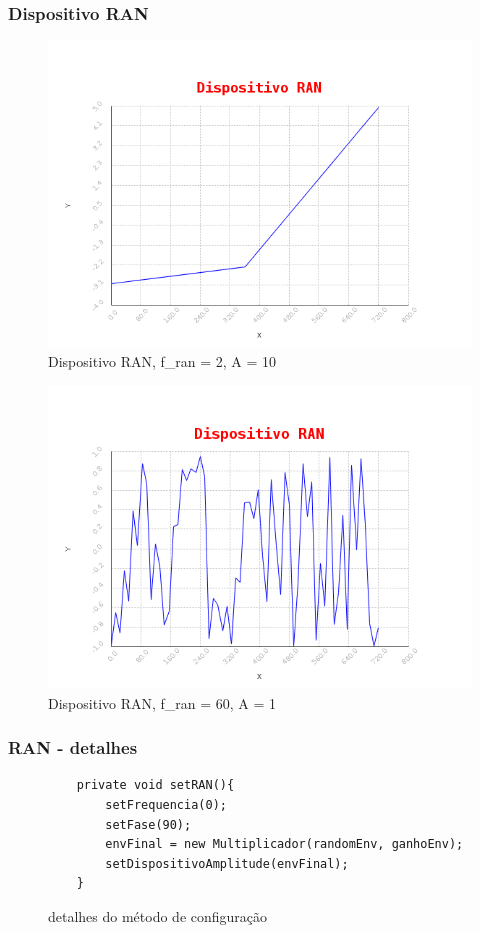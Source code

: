 \documentclass{beamer}
\begin{document}
\begin{frame}
 \frametitle{Dispositivo RAN}
 \begin{figure}
  \includegraphics[scale=0.4]{./images/RAN_F_2.png}
  \caption{Dispositivo RAN, f\_ran = 2, A = 10}
   \end{figure}
\end{frame}

   \begin{frame}
 \begin{figure}
  \includegraphics[scale=0.4]{./images/RAN_F_60.png}
  \caption{Dispositivo RAN, f\_ran = 60, A = 1}
 \end{figure} 
\end{frame}

 \begin{frame}[fragile]
 \frametitle{RAN - detalhes}
 \begin{figure}
 	\begin{lstlisting}
	private void setRAN(){
		setFrequencia(0);
		setFase(90);
		envFinal = new Multiplicador(randomEnv, ganhoEnv);
		setDispositivoAmplitude(envFinal);
	}
    			\end{lstlisting}
    			
    			\caption{detalhes do método de configuração}
	\end{figure}
\end{frame}
\end{document}
